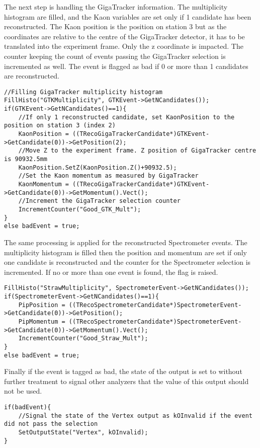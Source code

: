 The next step is handling the GigaTracker information. The multiplicity histogram are filled,
and the Kaon variables are set only if 1 candidate has been reconstructed. The Kaon position is the
position on station 3 but as the coordinates are relative to the centre of the GigaTracker
detector, it has to be translated into the experiment frame. Only the z coordinate is impacted.
The counter keeping the count of events passing the GigaTracker selection is incremented as well.
The event is flagged as bad if 0 or more than 1 candidates are reconstructed.

\begin{lstlisting}
//Filling GigaTracker multiplicity histogram
FillHisto("GTKMultiplicity", GTKEvent->GetNCandidates());
if(GTKEvent->GetNCandidates()==1){
	//If only 1 reconstructed candidate, set KaonPosition to the position on station 3 (index 2)
	KaonPosition = ((TRecoGigaTrackerCandidate*)GTKEvent->GetCandidate(0))->GetPosition(2);
	//Move Z to the experiment frame. Z position of GigaTracker centre is 90932.5mm  
	KaonPosition.SetZ(KaonPosition.Z()+90932.5);
	//Set the Kaon momentum as measured by GigaTracker
	KaonMomentum = ((TRecoGigaTrackerCandidate*)GTKEvent->GetCandidate(0))->GetMomentum().Vect();
	//Increment the GigaTracker selection counter
	IncrementCounter("Good_GTK_Mult");
}
else badEvent = true;
\end{lstlisting}

The same processing is applied for the reconstructed Spectrometer events. The multiplicity 
histogram is filled then the position and momentum are set if only one candidate is reconstructed
and the counter for the Spectrometer selection is incremented. If no or more than one event is
found, the  flag is raised.

\begin{lstlisting}
FillHisto("StrawMultiplicity", SpectrometerEvent->GetNCandidates());
if(SpectrometerEvent->GetNCandidates()==1){
	PipPosition = ((TRecoSpectrometerCandidate*)SpectrometerEvent->GetCandidate(0))->GetPosition();
	PipMomentum = ((TRecoSpectrometerCandidate*)SpectrometerEvent->GetCandidate(0))->GetMomentum().Vect();
	IncrementCounter("Good_Straw_Mult");
}
else badEvent = true;
\end{lstlisting}

Finally if the event is tagged as bad, the state of the output is set to  without
further treatment to signal other analyzers that the value of this output should not be used. 

\begin{lstlisting}
if(badEvent){
	//Signal the state of the Vertex output as kOInvalid if the event did not pass the selection
	SetOutputState("Vertex", kOInvalid);
}
\end{lstlisting}

